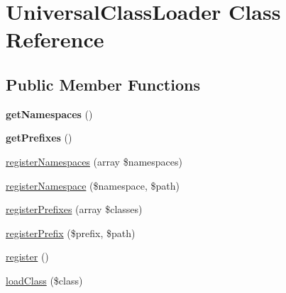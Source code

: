 \hypertarget{class_symfony_1_1_component_1_1_http_foundation_1_1_universal_class_loader}{
\section{\-Universal\-Class\-Loader \-Class \-Reference}
\label{class_symfony_1_1_component_1_1_http_foundation_1_1_universal_class_loader}
}
\subsection*{\-Public \-Member \-Functions}
\begin{DoxyCompactItemize}
\item 
\hypertarget{class_symfony_1_1_component_1_1_http_foundation_1_1_universal_class_loader_ae4c74dabb3e9ba4103ffd4e8febcac21}{
{\bfseries get\-Namespaces} ()}
\label{class_symfony_1_1_component_1_1_http_foundation_1_1_universal_class_loader_ae4c74dabb3e9ba4103ffd4e8febcac21}

\item 
\hypertarget{class_symfony_1_1_component_1_1_http_foundation_1_1_universal_class_loader_a102069675f7a94f8917f44acc2390687}{
{\bfseries get\-Prefixes} ()}
\label{class_symfony_1_1_component_1_1_http_foundation_1_1_universal_class_loader_a102069675f7a94f8917f44acc2390687}

\item 
\hyperlink{class_symfony_1_1_component_1_1_http_foundation_1_1_universal_class_loader_afd147d473364c7df6b9b327bae802b82}{register\-Namespaces} (array \$namespaces)
\item 
\hyperlink{class_symfony_1_1_component_1_1_http_foundation_1_1_universal_class_loader_afdd997b01513fe834e92dd511ed52c0e}{register\-Namespace} (\$namespace, \$path)
\item 
\hyperlink{class_symfony_1_1_component_1_1_http_foundation_1_1_universal_class_loader_aac41bbf07ccda9fe0a47842e5f40cbaa}{register\-Prefixes} (array \$classes)
\item 
\hyperlink{class_symfony_1_1_component_1_1_http_foundation_1_1_universal_class_loader_a0aa6735ce44d92ea33f6906ce3b14425}{register\-Prefix} (\$prefix, \$path)
\item 
\hyperlink{class_symfony_1_1_component_1_1_http_foundation_1_1_universal_class_loader_acc294a6cc8e69743746820e3d15e3f78}{register} ()
\item 
\hyperlink{class_symfony_1_1_component_1_1_http_foundation_1_1_universal_class_loader_a8326a997d0cfe76d80196f60d240d144}{load\-Class} (\$class)
\end{DoxyCompactItemize}

